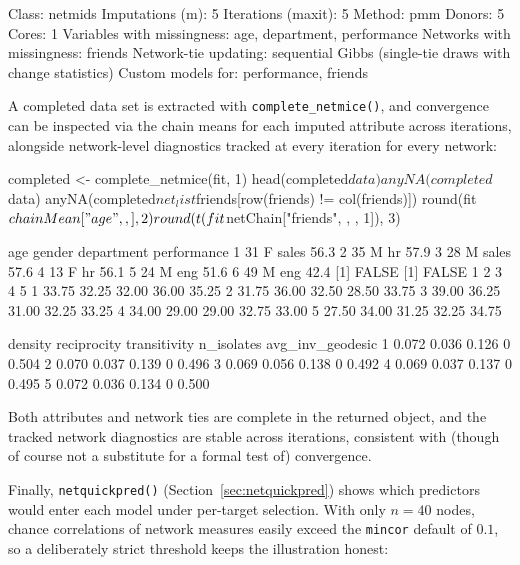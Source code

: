 \documentclass[11pt,a4paper]{article}
\newcommand{\code}[1]{\texttt{#1}}
\begin{document}
\begin{Routput}
Class: netmids
Imputations (m): 5   Iterations (maxit): 5   Method: pmm   Donors: 5   Cores: 1
Variables with missingness: age, department, performance
Networks with missingness: friends
Network-tie updating: sequential Gibbs (single-tie draws with change
statistics)
Custom models for: performance, friends
\end{Routput}

A completed data set is extracted with \code{complete\_netmice()}, and
convergence can be inspected via the chain means for each imputed attribute
across iterations, alongside network-level diagnostics tracked at every
iteration for every network:

\begin{Rinput}
completed <- complete_netmice(fit, 1)
head(completed$data)
anyNA(completed$data)
anyNA(completed$net_list$friends[row(friends) != col(friends)])
round(fit$chainMean["age", , ], 2)
round(t(fit$netChain["friends", , , 1]), 3)
\end{Rinput}

\begin{Routput}
  age gender department performance
1  31      F      sales        56.3
2  35      M         hr        57.9
3  28      M      sales        57.6
4  13      F         hr        56.1
5  24      M        eng        51.6
6  49      M        eng        42.4
[1] FALSE
[1] FALSE
      1     2     3     4     5
1 33.75 32.25 32.00 36.00 35.25
2 31.75 36.00 32.50 28.50 33.75
3 39.00 36.25 31.00 32.25 33.25
4 34.00 29.00 29.00 32.75 33.00
5 27.50 34.00 31.25 32.25 34.75

  density reciprocity transitivity n_isolates avg_inv_geodesic
1   0.072       0.036        0.126          0            0.504
2   0.070       0.037        0.139          0            0.496
3   0.069       0.056        0.138          0            0.492
4   0.069       0.037        0.137          0            0.495
5   0.072       0.036        0.134          0            0.500
\end{Routput}

Both attributes and network ties are complete in the returned object, and
the tracked network diagnostics are stable across iterations, consistent
with (though of course not a substitute for a formal test of) convergence.

Finally, \code{netquickpred()} (Section~\ref{sec:netquickpred}) shows
which predictors would enter each model under per-target selection. With
only $n = 40$ nodes, chance correlations of network measures easily exceed
the \code{mincor} default of $0.1$, so a deliberately strict threshold
keeps the illustration honest:
\end{document}
